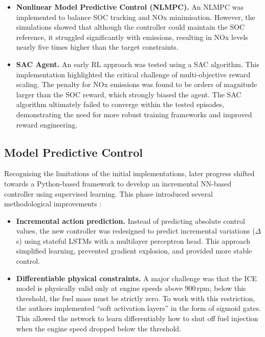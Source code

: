 \begin{itemize}
  \item \textbf{Nonlinear Model Predictive Control (NLMPC).} An NLMPC was implemented to balance \ac{SOC} tracking and \ac{NOx} minimisation. However, the simulations showed that although the controller could maintain the \ac{SOC} reference, it struggled significantly with emissions, resulting in \ac{NOx} levels nearly five times higher than the target constraints.
  \item \textbf{\ac{SAC} Agent.} An early \ac{RL} approach was tested using a \ac{SAC} algorithm. This implementation highlighted the critical challenge of multi-objective reward scaling. The penalty for \ac{NOx} emissions was found to be orders of magnitude larger than the \ac{SOC} reward, which strongly biased the agent. The \ac{SAC} algorithm ultimately failed to converge within the tested episodes, demonstrating the need for more robust training frameworks and improved reward engineering.
\end{itemize}

\subsection{Model Predictive Control}
Recognising the limitations of the initial implementations, later progress shifted towards a Python-based framework to develop an incremental \ac{NN}-based controller using supervised learning. This phase introduced several methodological improvements \cite{universitat_politecnica_de_catalunya_development_2025}:

\begin{itemize}
  \item \textbf{Incremental action prediction.} Instead of predicting absolute control values, the new controller was redesigned to predict incremental variations ($\Delta$s) using stateful \ac{LSTM}s with a multilayer perceptron head. This approach simplified learning, prevented gradient explosion, and provided more stable control.
  \item \textbf{Differentiable physical constraints.} A major challenge was that the \ac{ICE} model is physically valid only at engine speeds above 900\,rpm; below this threshold, the fuel mass must be strictly zero. To work with this restriction, the authors implemented ``soft activation layers'' in the form of sigmoid gates. This allowed the network to learn differentiably how to shut off fuel injection when the engine speed dropped below the threshold.
\end{itemize}

